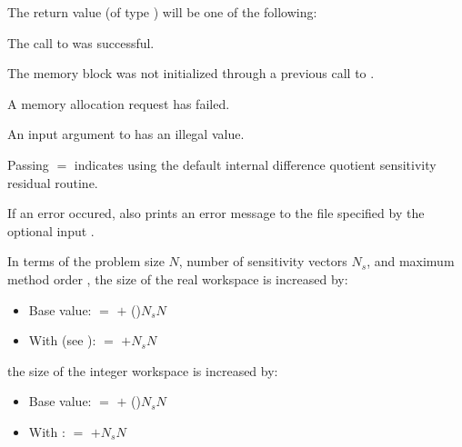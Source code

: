 {
  The return value  (of type ) will be one of the following:
  \begin{args}
  \item[\Id{IDA\_SUCCESS}]
    The call to  was successful.
  \item[\Id{IDA\_MEM\_NULL}] 
    The {\idas} memory block was not initialized through a 
    previous call to .
  \item[\Id{IDA\_MEM\_FAIL}] 
    A memory allocation request has failed.
  \item[\Id{IDA\_ILL\_INPUT}] 
    An input argument to  has an illegal value.
  \end{args}
}
{
  Passing $=$ indicates using the default internal difference 
  quotient sensitivity residual routine.

  If an error occured,  also prints an error message to the
  file specified by the optional input .
}
In terms of the problem size $N$, number of sensitivity vectors $N_s$, and maximum method 
order , the size of the real workspace is increased by:
\begin{itemize}
\item Base value:  $=$  $+$ ()$N_s N$
\item With  (see ): 
   $=$  $+ N_s N$ 
\end{itemize}
the size of the integer workspace is increased by:
\begin{itemize}
\item Base value:  $=$  $+$ ()$N_s N$
\item With :  $=$  $+ N_s N$ 
\end{itemize}

